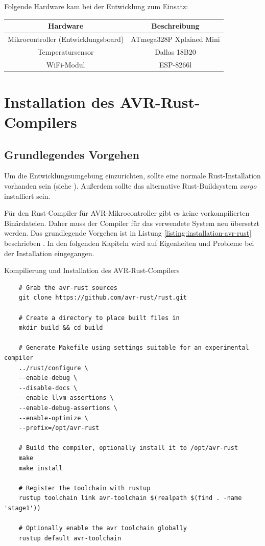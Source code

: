 \documentclass
[ 12pt,
  parskip=half %
]{scrreprt}
\newenvironment{mylisting}[1][H]
{\captionsetup{aboveskip=-0.2\normalbaselineskip}\begin{listing}[#1]}
{\end{listing}}
\begin{document}
Folgende Hardware kam bei der Entwicklung zum Einsatz:
\begin{center}
	\begin{tabulary}{\columnwidth}{|c|c|}
		\hline
		\textbf{Hardware} & \textbf{Beschreibung}\\
		\hline
		Mikrocontroller (Entwicklungsboard) & ATmega328P Xplained Mini\\
		\hline
		Temperatursensor & Dallas 18B20\\
		\hline
		WiFi-Modul & ESP-8266l\\
		\hline
	\end{tabulary}
\end{center}

\section{Installation des AVR-Rust-Compilers}

\subsection{Grundlegendes Vorgehen}

Um die Entwicklungsumgebung einzurichten, sollte eine normale Rust-Installation vorhanden sein (siehe \cite{rust-installation}). Außerdem sollte das alternative Rust-Buildsystem \textit{xargo} installiert sein.

Für den Rust-Compiler für AVR-Mikrocontroller gibt es keine vorkompilierten Binärdateien. Daher muss der Compiler für das verwendete System neu übersetzt werden. Das grundlegende Vorgehen ist in Listung \ref{listing:installation-avr-rust} beschrieben \cite{github-avr-rust}. In den folgenden Kapiteln wird auf Eigenheiten und Probleme bei der Installation eingegangen.

\begin{mylisting}
	\caption{Kompilierung und Installation des AVR-Rust-Compilers  \cite{github-avr-rust}}
	\label{listing:installation-avr-rust}
	\begin{verbatim}
	# Grab the avr-rust sources
	git clone https://github.com/avr-rust/rust.git
	
	# Create a directory to place built files in
	mkdir build && cd build
	
	# Generate Makefile using settings suitable for an experimental compiler
	../rust/configure \
	--enable-debug \
	--disable-docs \
	--enable-llvm-assertions \
	--enable-debug-assertions \
	--enable-optimize \
	--prefix=/opt/avr-rust
	
	# Build the compiler, optionally install it to /opt/avr-rust
	make
	make install
	
	# Register the toolchain with rustup
	rustup toolchain link avr-toolchain $(realpath $(find . -name 'stage1'))
	
	# Optionally enable the avr toolchain globally
	rustup default avr-toolchain
		\end{verbatim}
\end{mylisting}
\end{document}
